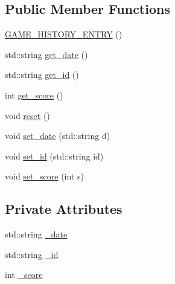 \subsection*{Public Member Functions}
\begin{DoxyCompactItemize}
\item 
\hyperlink{classAsteroids_1_1Domain_1_1Game_1_1GAME__HISTORY__ENTRY_a2c0700cfa33f03e73a68a72586454aa7}{G\+A\+M\+E\+\_\+\+H\+I\+S\+T\+O\+R\+Y\+\_\+\+E\+N\+T\+RY} ()
\item 
std\+::string \hyperlink{classAsteroids_1_1Domain_1_1Game_1_1GAME__HISTORY__ENTRY_abeb058c26f6ba722649ce0385d173e72}{get\+\_\+date} ()
\item 
std\+::string \hyperlink{classAsteroids_1_1Domain_1_1Game_1_1GAME__HISTORY__ENTRY_a25e3596750d9fa9b5af4ca219bd55089}{get\+\_\+id} ()
\item 
int \hyperlink{classAsteroids_1_1Domain_1_1Game_1_1GAME__HISTORY__ENTRY_a552223ab147d6dd6bad0f2f844cc9000}{get\+\_\+score} ()
\item 
void \hyperlink{classAsteroids_1_1Domain_1_1Game_1_1GAME__HISTORY__ENTRY_a022471c5c4f1a5d7a3f18f0f6866c9a8}{reset} ()
\item 
void \hyperlink{classAsteroids_1_1Domain_1_1Game_1_1GAME__HISTORY__ENTRY_adb0e9c9f31373615343821a552366b37}{set\+\_\+date} (std\+::string d)
\item 
void \hyperlink{classAsteroids_1_1Domain_1_1Game_1_1GAME__HISTORY__ENTRY_a888db2c5c245eed8e4d43fef01ac08df}{set\+\_\+id} (std\+::string id)
\item 
void \hyperlink{classAsteroids_1_1Domain_1_1Game_1_1GAME__HISTORY__ENTRY_a156c3017d2c591e7eaef0522a7e5249d}{set\+\_\+score} (int s)
\end{DoxyCompactItemize}
\subsection*{Private Attributes}
\begin{DoxyCompactItemize}
\item 
std\+::string \hyperlink{classAsteroids_1_1Domain_1_1Game_1_1GAME__HISTORY__ENTRY_ae74cbec7b81645f91b9e2175f7a66b14}{\+\_\+date}
\item 
std\+::string \hyperlink{classAsteroids_1_1Domain_1_1Game_1_1GAME__HISTORY__ENTRY_a666b51a2435733f578ef45e06ab9c473}{\+\_\+id}
\item 
int \hyperlink{classAsteroids_1_1Domain_1_1Game_1_1GAME__HISTORY__ENTRY_af4eb365a0cb6e5d4951f12287c1fa556}{\+\_\+score}
\end{DoxyCompactItemize}


